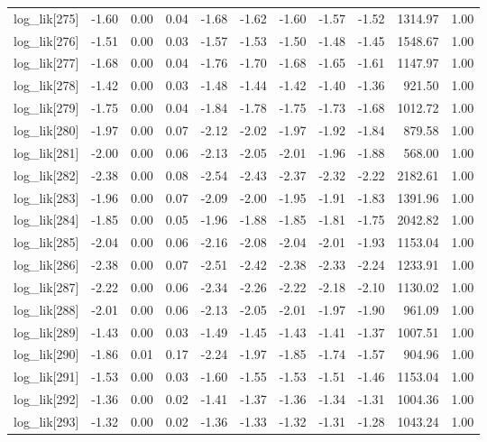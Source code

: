 \begin{table}[ht]
\begin{tabular}{rrrrrrrrrrr}
  log\_lik[275] & -1.60 & 0.00 & 0.04 & -1.68 & -1.62 & -1.60 & -1.57 & -1.52 & 1314.97 & 1.00 \\ 
  log\_lik[276] & -1.51 & 0.00 & 0.03 & -1.57 & -1.53 & -1.50 & -1.48 & -1.45 & 1548.67 & 1.00 \\ 
  log\_lik[277] & -1.68 & 0.00 & 0.04 & -1.76 & -1.70 & -1.68 & -1.65 & -1.61 & 1147.97 & 1.00 \\ 
  log\_lik[278] & -1.42 & 0.00 & 0.03 & -1.48 & -1.44 & -1.42 & -1.40 & -1.36 & 921.50 & 1.00 \\ 
  log\_lik[279] & -1.75 & 0.00 & 0.04 & -1.84 & -1.78 & -1.75 & -1.73 & -1.68 & 1012.72 & 1.00 \\ 
  log\_lik[280] & -1.97 & 0.00 & 0.07 & -2.12 & -2.02 & -1.97 & -1.92 & -1.84 & 879.58 & 1.00 \\ 
  log\_lik[281] & -2.00 & 0.00 & 0.06 & -2.13 & -2.05 & -2.01 & -1.96 & -1.88 & 568.00 & 1.00 \\ 
  log\_lik[282] & -2.38 & 0.00 & 0.08 & -2.54 & -2.43 & -2.37 & -2.32 & -2.22 & 2182.61 & 1.00 \\ 
  log\_lik[283] & -1.96 & 0.00 & 0.07 & -2.09 & -2.00 & -1.95 & -1.91 & -1.83 & 1391.96 & 1.00 \\ 
  log\_lik[284] & -1.85 & 0.00 & 0.05 & -1.96 & -1.88 & -1.85 & -1.81 & -1.75 & 2042.82 & 1.00 \\ 
  log\_lik[285] & -2.04 & 0.00 & 0.06 & -2.16 & -2.08 & -2.04 & -2.01 & -1.93 & 1153.04 & 1.00 \\ 
  log\_lik[286] & -2.38 & 0.00 & 0.07 & -2.51 & -2.42 & -2.38 & -2.33 & -2.24 & 1233.91 & 1.00 \\ 
  log\_lik[287] & -2.22 & 0.00 & 0.06 & -2.34 & -2.26 & -2.22 & -2.18 & -2.10 & 1130.02 & 1.00 \\ 
  log\_lik[288] & -2.01 & 0.00 & 0.06 & -2.13 & -2.05 & -2.01 & -1.97 & -1.90 & 961.09 & 1.00 \\ 
  log\_lik[289] & -1.43 & 0.00 & 0.03 & -1.49 & -1.45 & -1.43 & -1.41 & -1.37 & 1007.51 & 1.00 \\ 
  log\_lik[290] & -1.86 & 0.01 & 0.17 & -2.24 & -1.97 & -1.85 & -1.74 & -1.57 & 904.96 & 1.00 \\ 
  log\_lik[291] & -1.53 & 0.00 & 0.03 & -1.60 & -1.55 & -1.53 & -1.51 & -1.46 & 1153.04 & 1.00 \\ 
  log\_lik[292] & -1.36 & 0.00 & 0.02 & -1.41 & -1.37 & -1.36 & -1.34 & -1.31 & 1004.36 & 1.00 \\ 
  log\_lik[293] & -1.32 & 0.00 & 0.02 & -1.36 & -1.33 & -1.32 & -1.31 & -1.28 & 1043.24 & 1.00 \\ 

\end{tabular}
\end{table}
